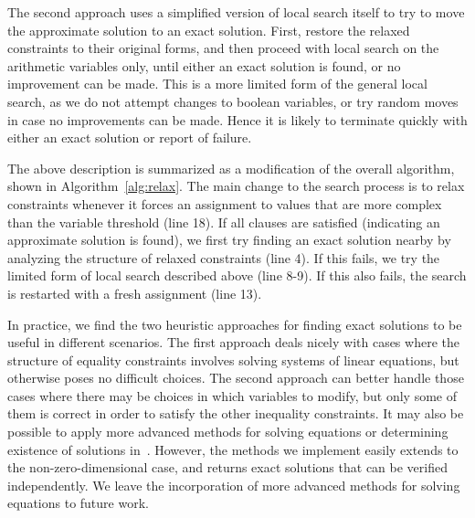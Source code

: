 \documentclass[runningheads]{llncs}
\begin{document}
The second approach uses a simplified version of local search itself to try to move the approximate solution to an exact solution. First, restore the relaxed constraints to their original forms, and then proceed with local search on the arithmetic variables only, until either an exact solution is found, or no improvement can be made. This is a more limited form of the general local search, as we do not attempt changes to boolean variables, or try random moves in case no improvements can be made. Hence it is likely to terminate quickly with either an exact solution or report of failure.

The above description is summarized as a modification of the overall algorithm, shown in Algorithm~\ref{alg:relax}. The main change to the search process is to relax constraints whenever it forces an assignment to values that are more complex than the variable threshold (line 18). If all clauses are satisfied (indicating an approximate solution is found), we first try finding an exact solution nearby by analyzing the structure of relaxed constraints (line 4). If this fails, we try the limited form of local search described above (line 8-9). If this also fails, the search is restarted with a fresh assignment (line 13).

In practice, we find the two heuristic approaches for finding exact solutions to be useful in different scenarios. The first approach deals nicely with cases where the structure of equality constraints involves solving systems of linear equations, but otherwise poses no difficult choices. The second approach can better handle those cases where there may be choices in which variables to modify, but only some of them is correct in order to satisfy the other inequality constraints. It may also be possible to apply more advanced methods for solving equations or determining existence of solutions in~\cite{LiXZ23b,CimattiGLS22}. However, the methods we implement easily extends to the non-zero-dimensional case, and returns exact solutions that can be verified independently. We leave the incorporation of more advanced methods for solving equations to future work.
\end{document}
